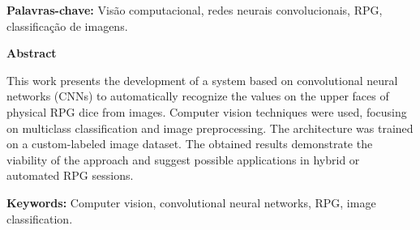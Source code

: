 \documentclass[12pt]{article}
\begin{document}
\vspace{0.5em}
\noindent
\textbf{Palavras-chave:} Visão computacional, redes neurais convolucionais, RPG, classificação de imagens.

\begin{center}
    \Large\textbf{Abstract}
\end{center}

\noindent
This work presents the development of a system based on convolutional neural networks (CNNs) to automatically recognize the values on the upper faces of physical RPG dice from images. Computer vision techniques were used, focusing on multiclass classification and image preprocessing. The architecture was trained on a custom-labeled image dataset. The obtained results demonstrate the viability of the approach and suggest possible applications in hybrid or automated RPG sessions.

\vspace{0.5em}
\noindent
\textbf{Keywords:} Computer vision, convolutional neural networks, RPG, image classification.
\newpage
\end{document}
